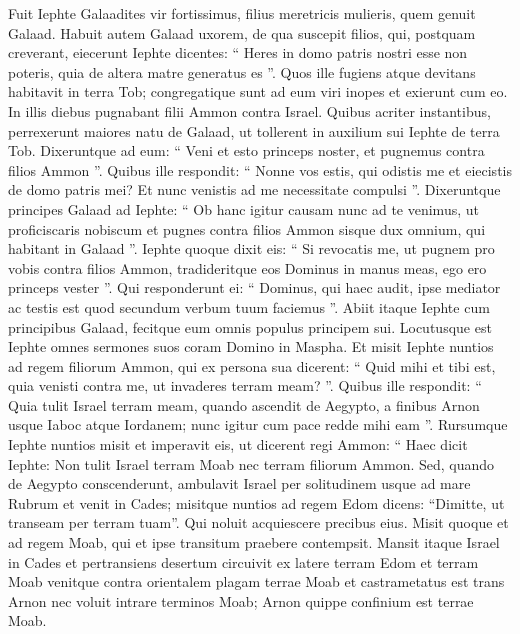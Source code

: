 \begin{biblechapter}
\begin{biblechapter}
\begin{biblechapter}
\begin{biblechapter}
\begin{biblechapter}
\begin{biblechapter}
\begin{biblechapter}
\begin{biblechapter}
\begin{biblechapter}
\begin{biblechapter}
\begin{biblechapter}
\verse Fuit Iephte Galaadites vir fortissimus, filius meretricis mulieris, quem genuit Galaad. 
\verse Habuit autem Galaad uxorem, de qua suscepit filios, qui, postquam creverant, eiecerunt Iephte dicentes: “ Heres in domo patris nostri esse non poteris, quia de altera matre generatus es ”. 
\verse Quos ille fugiens atque devitans habitavit in terra Tob; congregatique sunt ad eum viri inopes et exierunt cum eo.
 \verse In illis diebus pugnabant filii Ammon contra Israel. 
\verse Quibus acriter instantibus, perrexerunt maiores natu de Galaad, ut tollerent in auxilium sui Iephte de terra Tob. 
\verse Dixeruntque ad eum: “ Veni et esto princeps noster, et pugnemus contra filios Ammon ”. 
\verse Quibus ille respondit: “ Nonne vos estis, qui odistis me et eiecistis de domo patris mei? Et nunc venistis ad me necessitate compulsi ”. 
\verse Dixeruntque principes Galaad ad Iephte: “ Ob hanc igitur causam nunc ad te venimus, ut proficiscaris nobiscum et pugnes contra filios Ammon sisque dux omnium, qui habitant in Galaad ”. 
\verse Iephte quoque dixit eis: “ Si revocatis me, ut pugnem pro vobis contra filios Ammon, tradideritque eos Dominus in manus meas, ego ero princeps vester ”. 
\verse Qui responderunt ei: “ Dominus, qui haec audit, ipse mediator ac testis est quod secundum verbum tuum faciemus ”.
 \verse Abiit itaque Iephte cum principibus Galaad, fecitque eum omnis populus principem sui. Locutusque est Iephte omnes sermones suos coram Domino in Maspha.
 \verse Et misit Iephte nuntios ad regem filiorum Ammon, qui ex persona sua dicerent: “ Quid mihi et tibi est, quia venisti contra me, ut invaderes terram meam? ”. 
\verse Quibus ille respondit: “ Quia tulit Israel terram meam, quando ascendit de Aegypto, a finibus Arnon usque Iaboc atque Iordanem; nunc igitur cum pace redde mihi eam ”. 
\verse Rursumque Iephte nuntios misit et imperavit eis, ut dicerent regi Ammon: 
\verse “ Haec dicit Iephte: Non tulit Israel terram Moab nec terram filiorum Ammon. 
\verse Sed, quando de Aegypto conscenderunt, ambulavit Israel per solitudinem usque ad mare Rubrum et venit in Cades; 
\verse misitque nuntios ad regem Edom dicens: “Dimitte, ut transeam per terram tuam”. Qui noluit acquiescere precibus eius. Misit quoque et ad regem Moab, qui et ipse transitum praebere contempsit. Mansit itaque Israel in Cades 
\verse et pertransiens desertum circuivit ex latere terram Edom et terram Moab venitque contra orientalem plagam terrae Moab et castrametatus est trans Arnon nec voluit intrare terminos Moab; Arnon quippe confinium est terrae Moab. 

\end{biblechapter}
\end{biblechapter}
\end{biblechapter}
\end{biblechapter}
\end{biblechapter}
\end{biblechapter}
\end{biblechapter}
\end{biblechapter}
\end{biblechapter}
\end{biblechapter}
\end{biblechapter}
